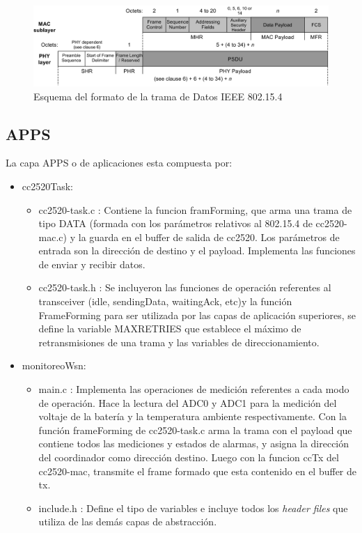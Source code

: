 {\vspace{20px}
\begin{figure}[h!]
	\centering
    \includegraphics[width=1\textwidth]{./Figures/data.jpg}
    	\caption{Esquema del formato de la trama de Datos IEEE 802.15.4 \citep{802154}}
	\label{fig:data}
\end{figure}

\subsection{APPS}
\label{subsec:apps}
La capa APPS	o de aplicaciones esta compuesta por:
\begin{itemize}
\item cc2520Task:
	\begin{itemize}
	\item cc2520-task.c : Contiene la funcion framForming, que arma una trama de tipo DATA (formada con los parámetros relativos al 802.15.4 de cc2520-mac.c) y la guarda en el buffer de salida de cc2520. Los parámetros de entrada son la dirección de destino y el payload. Implementa las funciones de enviar y recibir datos.
	\item cc2520-task.h : Se incluyeron las funciones de operación referentes al transceiver (idle, sendingData, waitingAck, etc)y la función FrameForming para ser utilizada por las capas de aplicación superiores, se define la variable MAXRETRIES que establece el máximo de retransmisiones de una trama y las variables de direccionamiento.
	\end{itemize}
\item monitoreoWsn:	
	\begin{itemize}
	\item main.c : Implementa las operaciones de medición referentes a cada modo de operación. Hace la lectura del ADC0 y ADC1 para la medición del voltaje de la batería y la temperatura ambiente respectivamente. Con la función frameForming de cc2520-task.c arma la trama con el payload que contiene todos las mediciones y estados de alarmas, y asigna la dirección del coordinador como dirección destino. Luego con la funcion ccTx del cc2520-mac, transmite el frame formado que esta contenido en el buffer de tx.
	\item include.h : Define el tipo de variables e incluye todos los \textit{header files} que utiliza de las demás capas de abstracción.
	\end{itemize}
\end{itemize}
}
